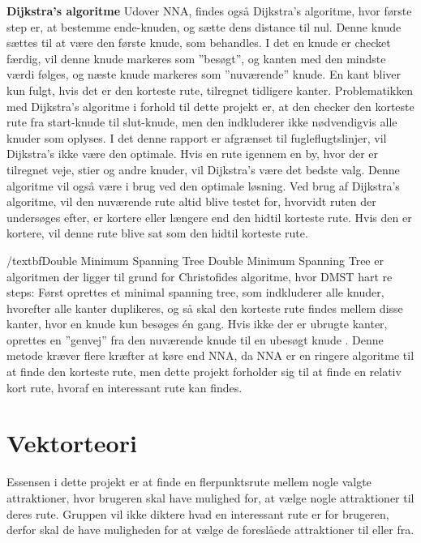 \textbf{Dijkstra's algoritme}\newline
Udover NNA, findes også Dijkstra’s algoritme, hvor første step er, at bestemme ende-knuden, og sætte dens distance til nul. Denne knude sættes til at være den første knude, som behandles. I det en knude er checket færdig, vil denne knude markeres som ”besøgt”, og kanten med den mindste værdi følges, og næste knude markeres som ”nuværende” knude. En kant bliver kun fulgt, hvis det er den korteste rute, tilregnet tidligere kanter.
Problematikken med Dijkstra’s algoritme i forhold til dette projekt er, at den checker den korteste rute fra start-knude til slut-knude, men den indkluderer ikke nødvendigvis alle knuder som oplyses. I det denne rapport er afgrænset til fugleflugtslinjer, vil Dijkstra’s ikke være den optimale. Hvis en rute igennem en by, hvor der er tilregnet veje, stier og andre knuder, vil Dijkstra’s være det bedste valg. Denne algoritme vil også være i brug ved den optimale løsning. Ved brug af Dijkstra’s algoritme, vil den nuværende rute altid blive testet for, hvorvidt ruten der undersøges efter, er kortere eller længere end den hidtil korteste rute. Hvis den er kortere, vil denne rute blive sat som den hidtil korteste rute. \citep{Dijkstra}

/textbf{Double Minimum Spanning Tree}
Double Minimum Spanning Tree er algoritmen der ligger til grund for Christofides algoritme, hvor DMST hart re steps: Først oprettes et minimal spanning tree, som indkluderer alle knuder, hvorefter alle kanter duplikeres, og så skal den korteste rute findes mellem disse kanter, hvor en knude kun besøges én gang. Hvis ikke der er ubrugte kanter, oprettes en ”genvej” fra den nuværende knude til en ubesøgt knude \citep{DMST}. Denne metode kræver flere kræfter at køre end NNA, da NNA er en ringere algoritme til at finde den korteste rute, men dette projekt forholder sig til at finde en relativ kort rute, hvoraf en interessant rute kan findes.



\section{Vektorteori}
Essensen i dette projekt er at finde en flerpunktsrute mellem nogle valgte attraktioner, hvor brugeren skal have mulighed for, at vælge nogle attraktioner til deres rute. Gruppen vil ikke diktere hvad en interessant rute er for brugeren, derfor skal de have muligheden for at vælge de foreslåede attraktioner til eller fra.

